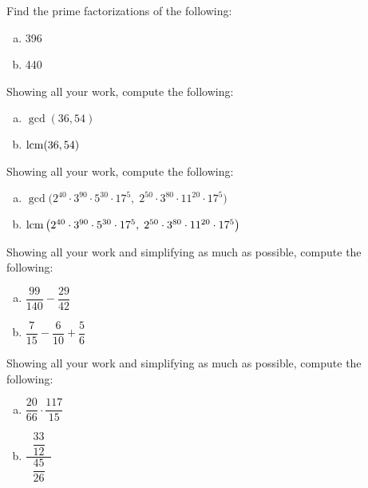 \documentclass[12pt,letterpaper]{exam}
\begin{document}
\begin{questions}

\newpage
\question[5] Find the prime factorizations of the following:
	\begin{enumerate}[(a)]
	\item 396
	\item 440
	\end{enumerate}



\newpage
\question[5] Showing all your work, compute the following:
	\begin{enumerate}[(a)]
	\item $\gcd(36, 54)$
	\item $\operatorname{lcm}(36, 54)$
	\end{enumerate}



\newpage
\question[5] Showing all your work, compute the following:
	\begin{enumerate}[(a)]
	\item $\gcd \big(2^{40} \cdot 3^{90} \cdot 5^{30} \cdot 17^5,\; 2^{50} \cdot 3^{80} \cdot 11^{20} \cdot 17^5 \big)$ \par\vspace{0.3cm}
	\item $\operatorname{lcm} \big(2^{40} \cdot 3^{90} \cdot 5^{30} \cdot 17^5,\; 2^{50} \cdot 3^{80} \cdot 11^{20} \cdot 17^5 \big)$
	\end{enumerate}



\newpage
\question[5] Showing all your work and simplifying as much as possible, compute the following:
	\begin{enumerate}[(a)]
	\item $\dfrac{99}{140} - \dfrac{29}{42}$ \par\vspace{0.3cm}
	\item $\dfrac{7}{15} - \dfrac{6}{10} + \dfrac{5}{6}$
	\end{enumerate}



\newpage
\question[5] Showing all your work and simplifying as much as possible, compute the following:
	\begin{enumerate}[(a)]
	\item $\dfrac{20}{66} \cdot \dfrac{117}{15}$ \par\vspace{0.3cm}
	\item $\dfrac{\;\;\dfrac{33}{12}\;\;}{\;\;\dfrac{45}{26}\;\;}$
	\end{enumerate}




\end{questions}
\end{document}
